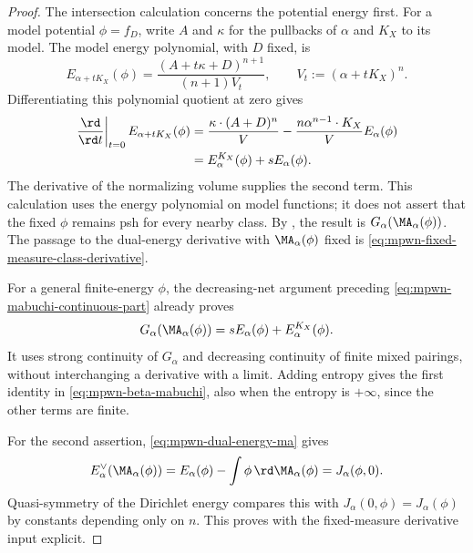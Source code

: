 \begin{proof}
The intersection calculation concerns the potential energy first.
For a model potential $\phi=f_D$, write $A$ and $\kappa$ for the
pullbacks of $\alpha$ and $K_X$ to its model.  The model energy
polynomial, with $D$ fixed, is
\[
 E_{\alpha+tK_X}(\phi)
       =\frac{(A+t\kappa+D)^{n+1}}{(n+1)V_t},
       \qquad V_t:=(\alpha+tK_X)^n.
\]
Differentiating this polynomial quotient at zero gives
\[
 \begin{aligned}
 \left.\frac{\rd}{\rd t}\right|_{t=0}E_{\alpha+tK_X}(\phi)
 &=\frac{\kappa\cdot(A+D)^n}{V}
       -\frac{n\alpha^{n-1}\cdot K_X}{V}E_\alpha(\phi)\\
 &=E_\alpha^{K_X}(\phi)+sE_\alpha(\phi).
 \end{aligned}
\]
The derivative of the normalizing volume supplies the second term.
This calculation uses the energy polynomial on model functions;
it does not assert that the fixed $\phi$ remains psh for every
nearby class.  By \cite[(4.2), (4.11) and
Proposition~4.5]{BJ25FiniteEnergy}, the result is
$G_\alpha(\MA_\alpha(\phi))$.
The passage to the dual-energy derivative with
$\MA_\alpha(\phi)$ fixed is \eqref{eq:mpwn-fixed-measure-class-derivative}.

For a general finite-energy $\phi$, the decreasing-net argument
preceding \eqref{eq:mpwn-mabuchi-continuous-part} already proves
\[
 G_\alpha(\MA_\alpha(\phi))
          =sE_\alpha(\phi)+E_\alpha^{K_X}(\phi).
\]
It uses strong continuity of $G_\alpha$ and decreasing continuity
of finite mixed pairings, without interchanging a derivative with
a limit.  Adding entropy gives the first identity in
\eqref{eq:mpwn-beta-mabuchi}, also when the entropy is $+\infty$,
since the other terms are finite.

For the second assertion, \eqref{eq:mpwn-dual-energy-ma} gives
\[
 E_\alpha^\vee(\MA_\alpha(\phi))
 =E_\alpha(\phi)-\int\phi\,\rd\MA_\alpha(\phi)
 =J_\alpha(\phi,0).
\]
Quasi-symmetry of the Dirichlet energy compares this with
$J_\alpha(0,\phi)=J_\alpha(\phi)$ by constants depending only
on $n$.  This proves \cite[Theorem~10.0.1]{MPWN25}
with the fixed-measure derivative input explicit.
\end{proof}

